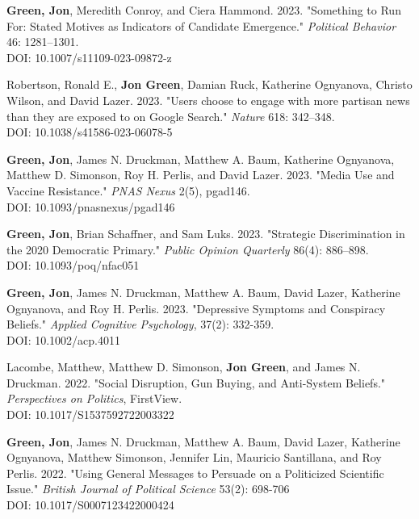 \documentclass[letterpaper]{article}
\begin{document}
\begin{etaremune}
\item \textbf{Green, Jon}, Meredith Conroy, and Ciera Hammond. 2023. "Something to Run For: Stated Motives as Indicators of Candidate Emergence." \textit{Political Behavior} 46: 1281–1301.\\
DOI: 10.1007/s11109-023-09872-z

\item Robertson, Ronald E., \textbf{Jon Green}, Damian Ruck, Katherine Ognyanova, Christo Wilson, and David Lazer. 2023. "Users choose to engage with more partisan news than they are exposed to on Google Search." \textit{Nature} 618: 342–348.\\
DOI: 10.1038/s41586-023-06078-5

\item \textbf{Green, Jon}, James N. Druckman, Matthew A. Baum, Katherine Ognyanova, Matthew D. Simonson, Roy H. Perlis, and David Lazer. 2023. "Media Use and Vaccine Resistance." \textit{PNAS Nexus} 2(5), pgad146.\\
DOI: 10.1093/pnasnexus/pgad146

\item \textbf{Green, Jon}, Brian Schaffner, and Sam Luks. 2023. "Strategic Discrimination in the 2020 Democratic Primary." \textit{Public Opinion Quarterly} 86(4): 886–898.\\
DOI: 10.1093/poq/nfac051

\item \textbf{Green, Jon}, James N. Druckman, Matthew A. Baum, David Lazer, Katherine Ognyanova, and Roy H. Perlis. 2023. "Depressive Symptoms and Conspiracy Beliefs." \textit{Applied Cognitive Psychology}, 37(2): 332-359. \\
DOI: 10.1002/acp.4011

\item Lacombe, Matthew, Matthew D. Simonson, \textbf{Jon Green}, and James N. Druckman. 2022. "Social Disruption, Gun Buying, and Anti-System Beliefs." \textit{Perspectives on Politics}, FirstView. \\
DOI: 10.1017/S1537592722003322

\item  \textbf{Green, Jon}, James N. Druckman, Matthew A. Baum, David Lazer, Katherine Ognyanova, Matthew Simonson, Jennifer Lin, Mauricio Santillana, and Roy Perlis. 2022. "Using General Messages to Persuade on a Politicized Scientific Issue." \textit{British Journal of Political Science} 53(2): 698-706 \\
DOI: 10.1017/S0007123422000424


\end{etaremune}
\end{document}
